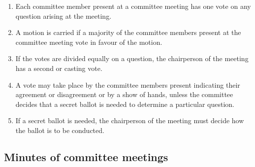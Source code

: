 \documentclass[../constitution.tex]{subfiles}
\begin{document}
\begin{enumerate}

\item Each committee member present at a committee meeting has one vote on any question arising at the meeting.
\item A motion is carried if a majority of the committee members present at the committee meeting vote in favour of the motion.
\item If the votes are divided equally on a question, the chairperson of the meeting has a second or casting vote.
\item A vote may take place by the committee members present indicating their agreement or disagreement or by a show of hands, unless the committee decides that a secret ballot is needed to determine a particular question.
\item If a secret ballot is needed, the chairperson of the meeting must decide how the ballot is to be conducted.
\end{enumerate}

\hypertarget{minutes-of-committee-meetings}{%
\subsection{Minutes of committee meetings}\label{minutes-of-committee-meetings}}
\end{document}

